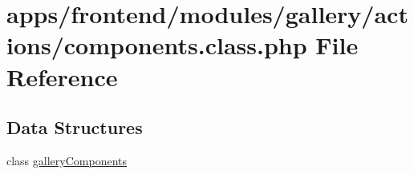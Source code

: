 \hypertarget{frontend_2modules_2gallery_2actions_2components_8class_8php}{\section{apps/frontend/modules/gallery/actions/components.class.\-php File Reference}
\label{frontend_2modules_2gallery_2actions_2components_8class_8php}
}
\subsection*{Data Structures}
\begin{DoxyCompactItemize}
\item 
class \hyperlink{classgallery_components}{gallery\-Components}
\end{DoxyCompactItemize}
